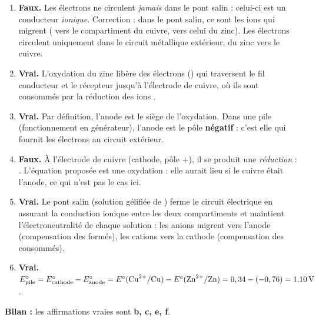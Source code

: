 \documentclass[11pt]{article}
\newcommand{\cle}[1]{{\popxbold\color{popdark}#1}}
\begin{document}
\begin{corrige}
\begin{enumerate}
\item[\textbf{a)}] \textbf{Faux.} Les électrons ne circulent \emph{jamais} dans le pont salin : celui-ci est un conducteur \emph{ionique}. Correction : dans le pont salin, ce sont les ions qui migrent ( vers le compartiment du cuivre,  vers celui du zinc). Les électrons circulent uniquement dans le circuit métallique extérieur, du zinc vers le cuivre.
\item[\textbf{b)}] \textbf{Vrai.} L'oxydation du zinc libère des électrons () qui traversent le fil conducteur et le récepteur jusqu'à l'électrode de cuivre, où ils sont consommés par la réduction des ions .
\item[\textbf{c)}] \textbf{Vrai.} Par définition, l'\cle{anode} est le siège de l'oxydation. Dans une pile (fonctionnement en générateur), l'anode est le pôle \textbf{négatif} : c'est elle qui fournit les électrons au circuit extérieur.
\item[\textbf{d)}] \textbf{Faux.} À l'électrode de cuivre (cathode, pôle $+$), il se produit une \emph{réduction} : . L'équation proposée  est une oxydation : elle aurait lieu si le cuivre était l'anode, ce qui n'est pas le cas ici.
\item[\textbf{e)}] \textbf{Vrai.} Le pont salin (solution gélifiée de ) ferme le circuit électrique en assurant la conduction ionique entre les deux compartiments et maintient l'électroneutralité de chaque solution : les anions migrent vers l'anode (compensation des  formés), les cations vers la cathode (compensation des  consommés).
\item[\textbf{f)}] \textbf{Vrai.} $E^{\circ}_{\text{pile}} = E^{\circ}_{\text{cathode}} - E^{\circ}_{\text{anode}} = E^{\circ}(\ce{Cu^2+}/\ce{Cu}) - E^{\circ}(\ce{Zn^2+}/\ce{Zn}) = 0,34 - (-0,76) = \SI{1,10}{V}$.
\end{enumerate}
\textbf{Bilan :} les affirmations vraies sont \textbf{b, c, e, f}.
\end{corrige}
\end{document}
